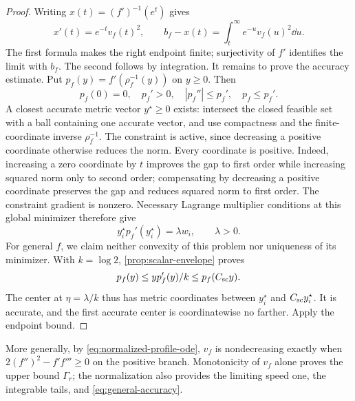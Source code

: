 \begin{proof}
Writing $x(t)=(f')^{-1}(e^t)$ gives
\begin{equation}
 x'(t)=e^{-t}v_f(t)^2,\qquad
 b_f-x(t)=\int_t^\infty e^{-u}v_f(u)^2\dd u.
 \label{eq:general-gap-tail}
\end{equation}
The first formula makes the right endpoint finite; surjectivity of
$f'$ identifies the limit with $b_f$. The second follows by integration.
It remains to prove the accuracy estimate. Put
$p_f(y)=f'(\rho_f^{-1}(y))$ on $y\geq0$. Then
\begin{equation}
 p_f(0)=0,\quad p_f'>0,\quad
 |p_f''|\leq p_f',\quad p_f\leq p_f'.
 \label{eq:general-p-conditions}
\end{equation}
A closest accurate metric vector $y^\star\geq0$ exists: intersect
the closed feasible set with a ball containing one accurate vector,
and use compactness and the finite-coordinate inverse $\rho_f^{-1}$.
The constraint is active, since decreasing a positive coordinate
otherwise reduces the norm. Every coordinate is positive. Indeed,
increasing a zero coordinate by $t$ improves the gap to first order
while increasing squared norm only to second order; compensating by
decreasing a positive coordinate preserves the gap and reduces squared
norm to first order. The constraint gradient is nonzero. Necessary
Lagrange multiplier conditions at this global minimizer therefore give
\begin{equation}
 y_i^\star p_f'(y_i^\star)=\lambda w_i,\qquad \lambda>0.
 \label{eq:general-accuracy-KKT}
\end{equation}
For general $f$, we claim neither convexity of this problem nor
uniqueness of its minimizer. With $k=\log2$, \cref{prop:scalar-envelope} proves
\[
 p_f(y)\leq yp_f'(y)/k\leq p_f(C_{\mathrm{sc}}y).
\]
The center at $\eta=\lambda/k$ thus has metric coordinates between
$y_i^\star$ and $C_{\mathrm{sc}}y_i^\star$. It is accurate, and the first
accurate center is coordinatewise no farther. Apply the endpoint bound.
\end{proof}

More generally, by \eqref{eq:normalized-profile-ode}, $v_f$ is
nondecreasing exactly when $2(f'')^2-f'f'''\geq0$ on the positive
branch. Monotonicity of $v_f$ alone proves the upper bound $\Gamma_r$;
the normalization also provides the limiting speed one, the
integrable tails, and \eqref{eq:general-accuracy}.

